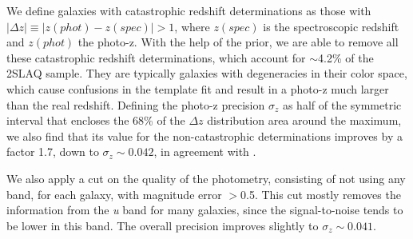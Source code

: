 We define galaxies with catastrophic redshift determinations as those with $|\Delta z| \equiv |z(phot) - z(spec)| > 1$, where $z(spec)$ is the spectroscopic redshift and $z(phot)$ the photo-z. With the help of the prior, we are able to remove all these catastrophic redshift determinations, which account for $\sim$4.2\% of the 2SLAQ sample. They are typically galaxies with degeneracies in their color space, which cause confusions in the template fit and result in a photo-z much larger than the real redshift. Defining the photo-z precision $\sigma_z$ as half of the symmetric interval that encloses the 68\% of the $\Delta z$ distribution area around the maximum, we also find that its value for the non-catastrophic determinations improves by a factor 1.7, down to $\sigma_z \sim0.042$, in agreement with \citet{Padmanabhan2005,Collister2007,Thomas2011b}.

We also apply a cut on the quality of the photometry, consisting of not using any band, for each galaxy, with magnitude error $>$0.5. This cut mostly removes the information from the \textit{u} band for many galaxies, since the signal-to-noise tends to be lower in this band. The overall precision improves slightly to $\sigma_z \sim0.041$.

